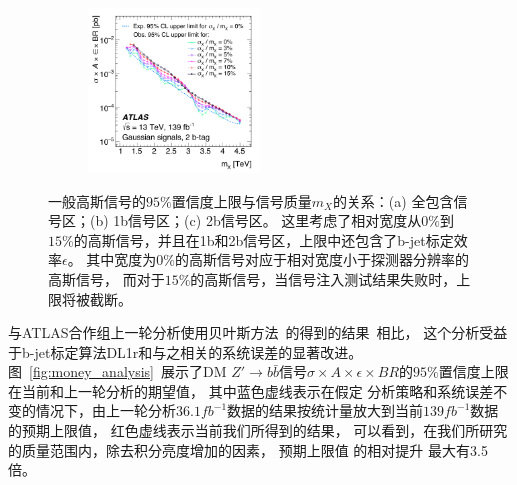 \begin{figure}[!thbp]
\newline 
  \begin{subfigure}{.99\textwidth}
  \centering
  \includegraphics[width=0.5\textwidth]{figs/fig_08c.pdf}
  \caption{}
  \end{subfigure}
  \caption{
  一般高斯信号的$95\%$置信度上限与信号质量$m_{X}$的关系：(a) 全包含信号区；(b) 1b信号区；(c) 2b信号区。
  这里考虑了相对宽度从$0\%$到$15\%$的高斯信号，并且在1b和2b信号区，上限中还包含了b-jet标定效率$\epsilon$。
  其中宽度为$0\%$的高斯信号对应于相对宽度小于探测器分辨率的高斯信号，
  而对于$15\%$的高斯信号，当信号注入测试结果失败时，上限将被截断。
}
\label{fig:gauss}
\end{figure}


与ATLAS合作组上一轮分析使用贝叶斯方法~\cite{Caldwell:2008fw}的得到的结果~\cite{EXOT-2016-33}相比，
这个分析受益于b-jet标定算法DL1r和与之相关的系统误差的显著改进。
图~\ref{fig:money_analysis}~展示了DM $Z' \to b\bar{b}$信号$\sigma\times A \times \epsilon \times BR$的$95\%$置信度上限在当前和上一轮分析的期望值，
其中蓝色虚线表示在假定
分析策略和系统误差不变的情况下，由上一轮分析$36.1fb^{-1}$数据的结果按统计量放大到当前$139fb^{-1}$数据的预期上限值，
红色虚线表示当前我们所得到的结果，
可以看到，在我们所研究的质量范围内，除去积分亮度增加的因素，
预期上限值
的相对提升
最大有3.5倍。

